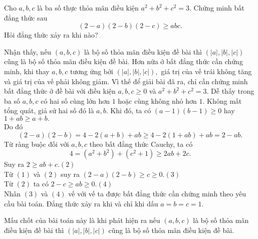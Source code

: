 \begin{bt}%
	Cho $a,b,c$ là ba số thực thỏa mãn điều kiện $a^2+b^2+c^2=3.$ Chứng minh bất đẳng thức sau
	$$ \left ( 2-a \right )\left ( 2-b \right )\left ( 2-c \right )\geq abc.$$
	Hỏi đẳng thức xảy ra khi nào? 
	\loigiai
	{Nhận thấy, nếu $(a,b,c)$ là bộ số thỏa mãn điều kiện đề bài thì $\left ( \left | a \right |,\left | b \right |,\left | c \right | \right ) $ cũng là bộ số thỏa mãn điều kiện đề bài. Hơn nữa ở bất đẳng thức cần chứng minh, khi thay $a,b,c$ tương ứng bởi $\left ( \left | a \right |,\left | b \right |,\left | c \right | \right ), $ giá trị của vế trái không tăng và giá trị của vế phải không giảm. Vì thế để giải bài đã ra, chỉ cần chứng minh bất đẳng thức ở đề bài với điều kiện $a,b,c\ge 0$ và $a^2+b^2+c^2=3.$
		Dễ thấy trong ba số $a,b,c$ có hai số cùng lớn hơn $1$ hoặc cùng không nhỏ hơn $1.$ Không mất tổng quát, giả sử hai số đó là $a,b$. Khi đó, ta có $\left ( a-1 \right )\left ( b-1 \right )\geq 0 $ hay $1+ab\ge a+b.$\\
		Do đó 
		\begin{equation*}
		\left ( 2-a \right )\left ( 2-b \right )=4-2\left ( a+b \right )+ab\geq 4-2\left ( 1+ab \right )+ab=2-ab.\tag{1}
		\end{equation*}
		Từ ràng buộc đối với $a,b,c$ theo bất đẳng thức Cauchy, ta có 
		$$ 4=\left (a^2+b^2  \right )+\left ( c^2+1 \right )\geq 2ab+2c.$$
		Suy ra $2\geq ab+c$.\hfill$(2)$\\
		Từ $(1)$ và $(2)$ suy ra $\left ( 2-a \right )\left ( 2-b \right )\geq c\geq 0$.\hfill$(3)$\\
		Từ $(2)$ ta có $2-c\geq ab\geq 0$.\hfill$(4)$\\
		Nhân $(3)$ và $(4)$ vế với vế ta được bất đẳng thức cần chứng minh theo yêu cầu bài toán.
		Đẳng thức xảy ra khi và chỉ khi dấu $a=b=c=1.$ 		
		\begin{nx} Mấu chốt của bài toán này là khi phát hiện ra nếu $(a,b,c)$ là bộ số thỏa mãn điều kiện đề bài thì $\left ( \left | a \right |,\left | b \right |,\left | c \right | \right ) $ cũng là bộ số thỏa mãn điều kiện đề bài.
		\end{nx}
	}
\end{bt}
